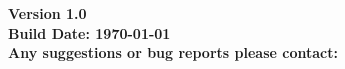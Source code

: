 \documentclass{qbook}
\begin{document}
\begin{sloppypar}	
	\pagestyle{empty}
	
	\begin{center}
		\Large{\sffamily\bfseries Version 1.0} \\ \vspace{2em}
		\Large{\sffamily\bfseries Build Date: \today} \\ \vspace{1em}
		\Large{\sffamily\bfseries Any suggestions or bug reports please contact:} \\
	\end{center} 
	\vfill
	\vspace{30em}
	\thispagestyle{empty}
	\frontmatter  %
	\pagestyle{empty}
	
	\tableofcontents
	\cleardoublepage
	\mainmatter	  %
	\pagestyle{fancy}
	\setcounter{page}{0}
	
	
	
	
	\renewcommand{\bibname}{Bibliography}
	\cleardoublepage     %
	
	\backmatter	
\end{sloppypar}
\end{document}
